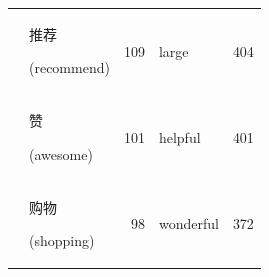 \documentclass[smallextended,natbib]{svjour3}       %
\begin{document}
\begin{table}[ht]
{\begin{tabular}{|c|lr|lr|}
                                                             & \begin{CJK}{UTF8}{gbsn}推荐\end{CJK} (recommend)       & 109   & large       & 404   \\  
                                                             & \begin{CJK}{UTF8}{gbsn}赞\end{CJK} (awesome)          & 101   & helpful     & 401   \\  
                                                             & \begin{CJK}{UTF8}{gbsn}购物\end{CJK} (shopping)        & 98    & wonderful   & 372   \\ \hline
        \end{tabular}%
        }
    \end{table}
\end{document}
